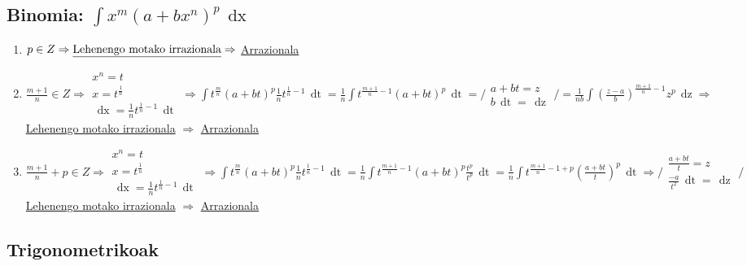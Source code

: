 \documentclass[8pt]{article}
\DeclareMathOperator{\xder}{\, \mathrm{d}x}
\DeclareMathOperator{\tder}{\, \mathrm{d}t}
\DeclareMathOperator{\zder}{\, \mathrm{d}z}
\begin{document}
	\subsection{Binomia: $ \int x^m {(a + b x^n)}^{p} \xder $}
		\begin{enumerate}
			\item $ p \in Z \Rightarrow  
				\text{\underline{Lehenengo motako irrazionala}}
				 \Rightarrow $
				\underline{Arrazionala}
			\item $ \frac{m+1}{n} \in Z \Rightarrow 
				\begin{array}{c}
					x^n = t\\
					x = t^{\frac{1}{n}}\\
					\xder = \frac{1}{n} t^{\frac{1}{n}-1} \tder
				\end{array} \Rightarrow
				\int t^{\frac{m}{n}} (a + bt)^p \frac{1}{n}
				t^{\frac{1}{n}-1} \tder = 
				\frac{1}{n} \int t^{\frac{m+1}{n}-1}
				(a + bt)^p \tder =
				\Big/
				\begin{array}{c}
					a + bt = z\\
					b \tder = \zder
				\end{array} 
				\Big/ = 
				\frac{1}{nb} \int (\frac{z-a}{b})^{\frac{m+1}{n}-1}
				z^p \zder \Rightarrow $
				\underline{Lehenengo motako irrazionala} 
				$ \Rightarrow $
				\underline{Arrazionala}
			\item $ \frac{m+1}{n} + p \in Z \Rightarrow
				\begin{array}{c}
					x^n = t\\
					x = t^{\frac{1}{n}}\\
					\xder = \frac{1}{n} t^{\frac{1}{n}-1} \tder
				\end{array} \Rightarrow
				\int t^{\frac{m}{n}} (a + bt)^p \frac{1}{n}
				t^{\frac{1}{n}-1} \tder = \frac{1}{n}
				\int t^{\frac{m+1}{n}-1} (a + bt)^p
				\frac{t^p}{t^p} \tder = \frac{1}{n}
				\int t^{\frac{m+1}{n}-1+p}
				(\frac{a + bt}{t})^p \tder \Rightarrow
				\Big/
				\begin{array}{c}
					\frac{a + bt}{t} = z\\
					\frac{-a}{t^2} \tder = \zder
				\end{array} \Big/
				$ \underline{Lehenengo motako irrazionala}
				$ \Rightarrow $ \underline{Arrazionala}
		\end{enumerate}

	\subsection{Trigonometrikoak}
\end{document}
